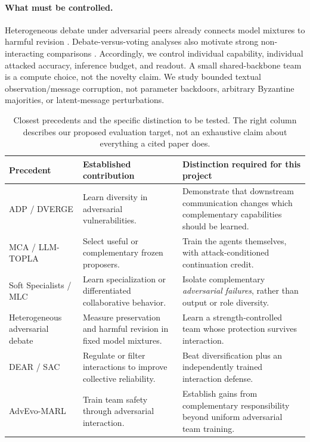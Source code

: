 \documentclass[10pt,twocolumn]{article}
\begin{document}
\paragraph{What must be controlled.}
Heterogeneous debate under adversarial peers already connects model mixtures to harmful revision \citep{nilayam2026heterogeneous}. Debate-versus-voting analyses also motivate strong non-interacting comparisons \citep{choi2025vote}. Accordingly, we control individual capability, individual attacked accuracy, inference budget, and readout. A small shared-backbone team is a compute choice, not the novelty claim. We study bounded textual observation/message corruption, not parameter backdoors, arbitrary Byzantine majorities, or latent-message perturbations.

\begin{table}[t]
\centering\small
\caption{Closest precedents and the specific distinction to be tested. The right column describes our proposed evaluation target, not an exhaustive claim about everything a cited paper does.}
\label{tab:position}
\begin{tabularx}{\textwidth}{@{}p{}p{}X@{}}
\toprule
Precedent & Established contribution & Distinction required for this project \\
\midrule
ADP / DVERGE & Learn diversity in adversarial vulnerabilities. & Demonstrate that downstream communication changes which complementary capabilities should be learned. \\
MCA / LLM-TOPLA & Select useful or complementary frozen proposers. & Train the agents themselves, with attack-conditioned continuation credit. \\
Soft Specialists / MLC & Learn specialization or differentiated collaborative behavior. & Isolate complementary \emph{adversarial failures}, rather than output or role diversity. \\
Heterogeneous adversarial debate & Measure preservation and harmful revision in fixed model mixtures. & Learn a strength-controlled team whose protection survives interaction. \\
DEAR / SAC & Regulate or filter interactions to improve collective reliability. & Beat diversification plus an independently trained interaction defense. \\
AdvEvo-MARL & Train team safety through adversarial interaction. & Establish gains from complementary responsibility beyond uniform adversarial team training. \\
\bottomrule
\end{tabularx}
\end{table}
\end{document}
